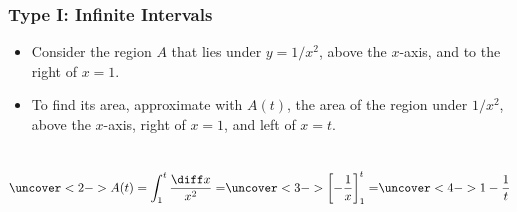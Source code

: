 
\begin{frame}
\frametitle{Type I: Infinite Intervals}
\begin{itemize}
\item  Consider the region $A$ that lies under $y = 1/x^2$, above the $x$-axis, and to the right of $x = 1$.
\item<2->  To find its area, approximate with $A(t)$, the area of the region under $1/x^2$, above the $x$-axis, right of $x = 1$, and left of $x = t$.
\end{itemize}
\begin{columns}[c]
\[
\uncover<2->{%
A(t) = \int_1^t \frac{\diff x}{x^2} = %
}%
\uncover<3->{%
\left[ -\frac{1}{x}\right]_1^t = %
}%
\uncover<4->{%
1 - \frac{1}{t}
}%
\]


\end{columns}
\end{frame}
